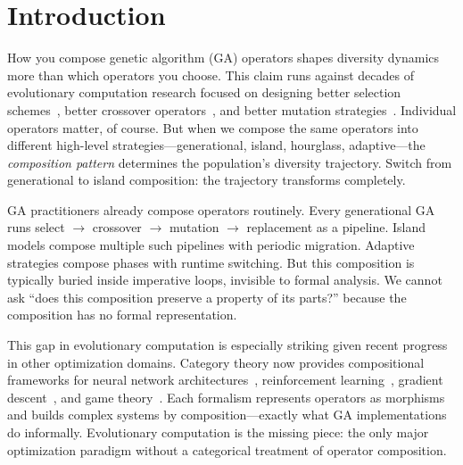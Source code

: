 \documentclass[dvipsnames,format=sigconf,anonymous=false,review=false]{acmart}
\begin{document}

\maketitle

\section{Introduction}

How you compose genetic algorithm (GA) operators shapes diversity dynamics more than which operators you choose. This claim runs against decades of evolutionary computation research focused on designing better selection schemes~\cite{blickle1996comparison}, better crossover operators~\cite{eshelman1993crossover}, and better mutation strategies~\cite{back1996evolutionary}. Individual operators matter, of course. But when we compose the same operators into different high-level strategies---generational, island, hourglass, adaptive---the \emph{composition pattern} determines the population's diversity trajectory. Switch from generational to island composition: the trajectory transforms completely.

GA practitioners already compose operators routinely. Every generational GA runs select $\to$ crossover $\to$ mutation $\to$ replacement as a pipeline. Island models compose multiple such pipelines with periodic migration. Adaptive strategies compose phases with runtime switching. But this composition is typically buried inside imperative loops, invisible to formal analysis. We cannot ask ``does this composition preserve a property of its parts?'' because the composition has no formal representation.

This gap in evolutionary computation is especially striking given recent progress in other optimization domains. Category theory now provides compositional frameworks for neural network architectures~\cite{gavranovic2024categorical}, reinforcement learning~\cite{bakirtzis2024compositional, hedges2024reinforcement}, gradient descent~\cite{hanks2024gradient}, and game theory~\cite{ghani2025approximate}. Each formalism represents operators as morphisms and builds complex systems by composition---exactly what GA implementations do informally. Evolutionary computation is the missing piece: the only major optimization paradigm without a categorical treatment of operator composition.
\end{document}
